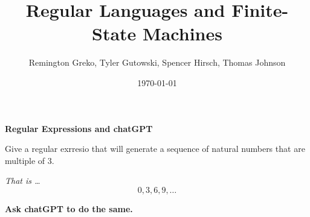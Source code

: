 \documentclass{article}
\begin{document}
\title{Regular Languages and Finite-State Machines}
\author{Remington Greko, Tyler Gutowski, Spencer Hirsch, Thomas Johnson}
\date{\today}

\maketitle

\textbf{Regular Expressions and chatGPT}

Give a regular exrresio that will generate a sequence of natural numbers
that are multiple of 3.

\textit{That is \dots}
\[0, 3, 6, 9, \dots \]

\medskip

\textbf{Ask chatGPT to do the same.}

\medskip
\end{document}
